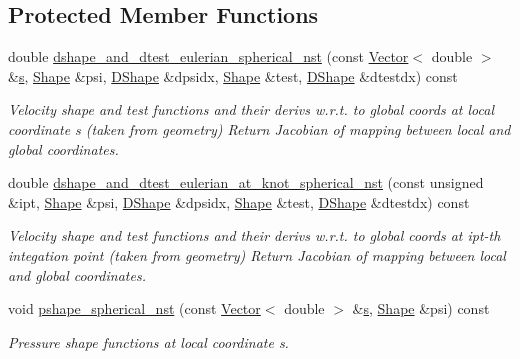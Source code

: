 \subsection*{Protected Member Functions}
\begin{DoxyCompactItemize}
\item 
double \hyperlink{classoomph_1_1QSphericalCrouzeixRaviartElement_afee40460a2cfad52d95fc9681c8d6a12}{dshape\+\_\+and\+\_\+dtest\+\_\+eulerian\+\_\+spherical\+\_\+nst} (const \hyperlink{classoomph_1_1Vector}{Vector}$<$ double $>$ \&\hyperlink{cfortran_8h_ab7123126e4885ef647dd9c6e3807a21c}{s}, \hyperlink{classoomph_1_1Shape}{Shape} \&psi, \hyperlink{classoomph_1_1DShape}{D\+Shape} \&dpsidx, \hyperlink{classoomph_1_1Shape}{Shape} \&test, \hyperlink{classoomph_1_1DShape}{D\+Shape} \&dtestdx) const
\begin{DoxyCompactList}\small\item\em Velocity shape and test functions and their derivs w.\+r.\+t. to global coords at local coordinate s (taken from geometry) Return Jacobian of mapping between local and global coordinates. \end{DoxyCompactList}\item 
double \hyperlink{classoomph_1_1QSphericalCrouzeixRaviartElement_a75cdf25c724edcd05b37f5bc2c29e903}{dshape\+\_\+and\+\_\+dtest\+\_\+eulerian\+\_\+at\+\_\+knot\+\_\+spherical\+\_\+nst} (const unsigned \&ipt, \hyperlink{classoomph_1_1Shape}{Shape} \&psi, \hyperlink{classoomph_1_1DShape}{D\+Shape} \&dpsidx, \hyperlink{classoomph_1_1Shape}{Shape} \&test, \hyperlink{classoomph_1_1DShape}{D\+Shape} \&dtestdx) const
\begin{DoxyCompactList}\small\item\em Velocity shape and test functions and their derivs w.\+r.\+t. to global coords at ipt-\/th integation point (taken from geometry) Return Jacobian of mapping between local and global coordinates. \end{DoxyCompactList}\item 
void \hyperlink{classoomph_1_1QSphericalCrouzeixRaviartElement_ae5be79781d11702c84d9493646153e36}{pshape\+\_\+spherical\+\_\+nst} (const \hyperlink{classoomph_1_1Vector}{Vector}$<$ double $>$ \&\hyperlink{cfortran_8h_ab7123126e4885ef647dd9c6e3807a21c}{s}, \hyperlink{classoomph_1_1Shape}{Shape} \&psi) const
\begin{DoxyCompactList}\small\item\em Pressure shape functions at local coordinate s. \end{DoxyCompactList}\item 

\end{DoxyCompactItemize}

